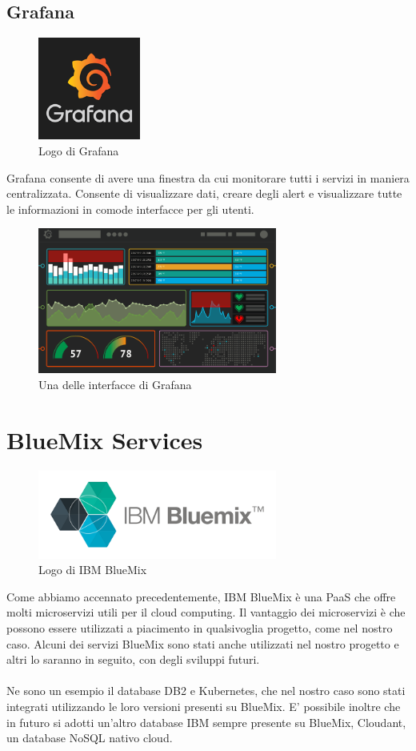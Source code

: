 \subsection{Grafana}
\begin{figure}[h!]
	\centering
	\includegraphics[width=0.3\textwidth,keepaspectratio=true]{capitoli/imgs/grafanalogo.png}
	\caption{Logo di Grafana}
\end{figure}
Grafana consente di avere una finestra da cui monitorare tutti i servizi in maniera centralizzata. Consente di visualizzare dati, creare degli alert e visualizzare tutte le informazioni in comode interfacce per gli utenti.
\begin{figure}[h!]
	\centering
	\includegraphics[width=0.7\textwidth,keepaspectratio=true]{capitoli/imgs/grafanainterface.PNG}
	\caption{Una delle interfacce di Grafana}
\end{figure}

\section{BlueMix Services}
\begin{figure}[h!]
	\centering
	\includegraphics[width=0.7\textwidth,keepaspectratio=true]{capitoli/imgs/bluemixlogo.png}
	\caption{Logo di IBM BlueMix}
\end{figure}
Come abbiamo accennato precedentemente, IBM BlueMix è una PaaS che offre molti microservizi utili per il cloud computing. Il vantaggio dei microservizi è che possono essere utilizzati a piacimento in qualsivoglia progetto, come nel nostro caso. Alcuni dei servizi BlueMix sono stati anche utilizzati nel nostro progetto e altri lo saranno in seguito, con degli sviluppi futuri.
\paragraph{}
Ne sono un esempio il database DB2 e Kubernetes, che nel nostro caso sono stati integrati utilizzando le loro versioni presenti su BlueMix. E' possibile inoltre che in futuro si adotti un'altro database IBM sempre presente su BlueMix, Cloudant, un database NoSQL nativo cloud.
